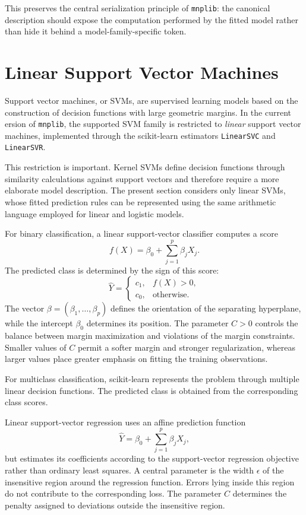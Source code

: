 This preserves the central serialization principle of \texttt{mnplib}: the canonical description should expose the computation performed by the fitted model rather than hide it behind a model-family-specific token.

%
%

\section{Linear Support Vector Machines}
\label{subsec:automl_svm}


Support vector machines, or SVMs, are supervised learning models based on the construction of decision functions with large geometric margins. In the current ersion of \texttt{mnplib}, the supported SVM family is restricted to \emph{linear} support vector machines, implemented through the scikit-learn estimators \texttt{LinearSVC} and \texttt{LinearSVR}.

This restriction is important. Kernel SVMs define decision functions through similarity calculations against support vectors and therefore require a more elaborate model description. The present section considers only linear SVMs, whose fitted prediction rules can be represented using the same arithmetic language employed for linear and logistic models.

For binary classification, a linear support-vector classifier computes a score
\[
f(X) = \beta_0 + \sum_{j=1}^{p} \beta_j X_j.
\]
The predicted class is determined by the sign of this score:
\[
\widehat{Y} =
\begin{cases}
c_1, & f(X)>0,\\
c_0, & \text{otherwise}.
\end{cases}
\]
The vector $\beta=(\beta_1,\ldots,\beta_p)$ defines the orientation of the separating hyperplane, while the intercept $\beta_0$ determines its position. The parameter $C>0$ controls the balance between margin maximization and violations of the margin constraints. Smaller values of $C$ permit a softer margin and stronger regularization, whereas larger values place greater emphasis on fitting the training observations.

For multiclass classification, scikit-learn represents the problem through multiple linear decision functions. The predicted class is obtained from the corresponding class scores.

Linear support-vector regression uses an affine prediction function
\[
\widehat{Y} = \beta_0 + \sum_{j=1}^{p} \beta_j X_j,
\]
but estimates its coefficients according to the support-vector regression objective rather than ordinary least squares. A central parameter is the width $\epsilon$ of the insensitive region around the regression function. Errors lying inside this region do not contribute to the corresponding loss. The parameter $C$ determines the penalty assigned to deviations outside the insensitive region.

